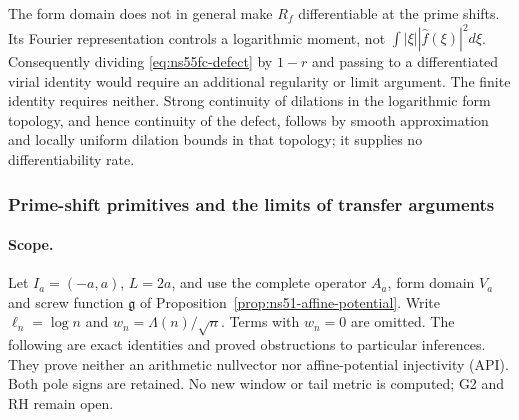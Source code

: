 \documentclass[11pt]{article}
\theoremstyle{remark}
\begin{document}
The form domain does not in general make $R_f$ differentiable at the
prime shifts. Its Fourier representation controls a logarithmic moment,
not $\int|\xi||\widehat f(\xi)|^2d\xi$. Consequently dividing
\eqref{eq:ns55fc-defect} by $1-r$ and passing to a differentiated
virial identity would require an additional regularity or limit
argument. The finite identity requires neither. Strong continuity of
dilations in the logarithmic form topology, and hence continuity of
the defect, follows by smooth approximation and locally uniform
dilation bounds in that topology; it supplies no differentiability rate.


\subsubsection*{Prime-shift primitives and the limits of transfer arguments}

\paragraph{Scope.}
Let $I_a=(-a,a)$, $L=2a$, and use the complete operator $A_a$,
form domain $V_a$ and screw function $\mathfrak g$ of
Proposition~\ref{prop:ns51-affine-potential}. Write
$\ell_n=\log n$ and $w_n=\Lambda(n)/\sqrt n$. Terms with
$w_n=0$ are omitted. The following are exact identities and proved
obstructions to particular inferences. They prove neither an arithmetic
nullvector nor affine-potential injectivity (API). Both pole signs are
retained. No new window or tail metric is computed; G2 and RH remain open.
\end{document}
